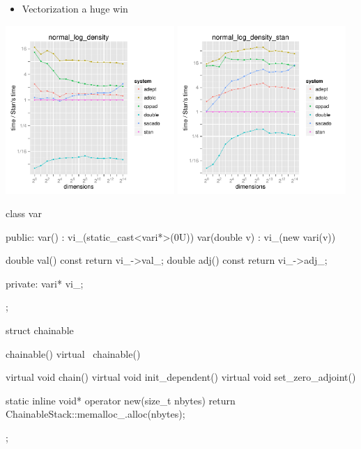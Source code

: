 \documentclass[10pt]{report}
\begin{document}
%
\begin{itemize}
\item Vectorization a huge win
\end{itemize}
\vspace*{-8pt}
\hfill \hfill
\includegraphics[width=0.48\textwidth]{img/normal_log_density_rel_eval.pdf}
\hfill
\includegraphics[width=0.48\textwidth]{img/normal_log_density_stan_rel_eval.pdf}
\hfill \hfill




\begin{stancode}
class var {
public:
  var() : vi_(static_cast<vari*>(0U)) { }
  var(double v) : vi_(new vari(v)) { }

  double val() const { return vi_->val_; }
  double adj() const { return vi_->adj_; }

private:
  vari* vi_;
};
\end{stancode}


%
\begin{stancode}
struct chainable {
  chainable() { }
  virtual ~chainable() { }

  virtual void chain() { }
  virtual void init_dependent() { }
  virtual void set_zero_adjoint() { }

  static inline void* operator new(size_t nbytes) {
    return ChainableStack::memalloc_.alloc(nbytes);
  }
};
\end{stancode}
\end{document}
